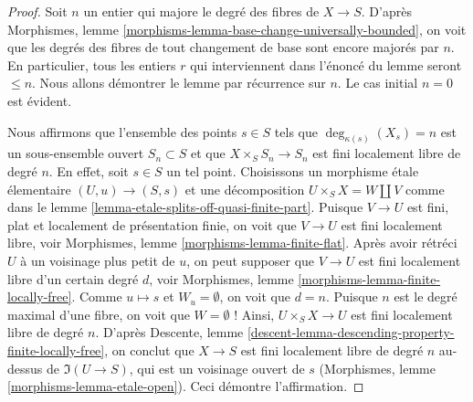 \begin{proof}
Soit $n$ un entier qui majore le degré des fibres de $X \to S$.
D'après Morphismes, lemme \ref{morphisms-lemma-base-change-universally-bounded},
on voit que les degrés des fibres de tout changement de base sont encore majorés par $n$.
En particulier, tous les entiers $r$ qui interviennent dans l'énoncé du lemme
seront $\leq n$. Nous allons démontrer le lemme par récurrence sur $n$. Le cas
initial $n = 0$ est évident.

\medskip\noindent
Nous affirmons que l'ensemble des points $s \in S$
tels que $\deg_{\kappa(s)}(X_s) = n$ est un sous-ensemble ouvert $S_n \subset S$
et que $X \times_S S_n \to S_n$ est fini localement libre de degré $n$.
En effet, soit $s \in S$ un tel point. Choisissons un morphisme étale
\'elementaire $(U, u) \to (S, s)$ et une décomposition
$U \times_S X = W \amalg V$ comme dans le
lemme \ref{lemma-etale-splits-off-quasi-finite-part}.
Puisque $V \to U$ est fini, plat et localement de présentation finie,
on voit que $V \to U$ est fini localement libre, voir
Morphismes, lemme \ref{morphisms-lemma-finite-flat}.
Après avoir rétréci $U$ à un voisinage plus petit de $u$,
on peut supposer que $V \to U$ est fini localement libre d'un certain degré $d$, voir
Morphismes, lemme \ref{morphisms-lemma-finite-locally-free}.
Comme $u \mapsto s$ et $W_u = \emptyset$, on voit que $d = n$. Puisque $n$
est le degré maximal d'une fibre, on voit que $W = \emptyset$ !
Ainsi, $U \times_S X \to U$ est fini localement libre de degré $n$.
D'après Descente, lemme \ref{descent-lemma-descending-property-finite-locally-free},
on conclut que $X \to S$ est fini localement libre de degré $n$
au-dessus de $\Im(U \to S)$, qui est un voisinage ouvert de $s$
(Morphismes, lemme \ref{morphisms-lemma-etale-open}).
Ceci démontre l'affirmation.


\end{proof}
